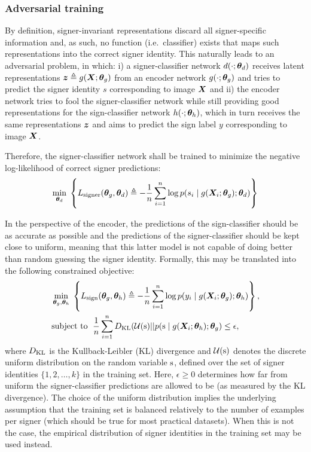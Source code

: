 

\subsubsection{Adversarial training}
By definition, signer-invariant representations discard all signer-specific information and, as such, no function (i.e.\ classifier) exists that maps such representations into the correct signer identity. This naturally leads to an adversarial problem, in which: i) a signer-classifier network $d(\cdot; {\bm{\theta}}_d)$ receives latent representations ${\bm{z}} \triangleq g({\bm{X}};{\bm{\theta}}_g)$ from an encoder network $g(\cdot;{\bm{\theta}}_g)$ and tries to predict the signer identity $s$ corresponding to image ${\bm{X}}$ and ii) the encoder network tries to fool the signer-classifier network while still providing good representations for the sign-classifier network $h(\cdot; {\bm{\theta}}_h)$, which in turn receives the same representations ${\bm{z}}$ and aims to predict the sign label $y$ corresponding to image ${\bm{X}}$.

Therefore, the signer-classifier network shall be trained to minimize the negative log-likelihood of correct signer predictions:
\begin{equation}
    \label{eq:signer_loss}
    \min_{{\bm{\theta}}_d} \; \left\lbrace L_{\text{signer}}({\bm{\theta}}_g, {\bm{\theta}}_d) \triangleq -\frac{1}{n}\sum_{i=1}^n \log p(s_i \mid g({\bm{X}}_{i}; {\bm{\theta}}_g); {\bm{\theta}}_d) \right\rbrace
\end{equation}

In the perspective of the encoder, the predictions of the sign-classifier should be as accurate as possible and the predictions of the signer-classifier should be kept close to uniform, meaning that this latter model is not capable of doing better than random guessing the signer identity. Formally, this may be translated into the following constrained objective:
\begin{align}
    \label{eq:sign_loss}
    &\min_{{\bm{\theta}}_g, {\bm{\theta}}_h} \; \left\lbrace L_{\text{sign}}({\bm{\theta}}_g, {\bm{\theta}}_h)\triangleq-\frac{1}{n}\sum_{i=1}^n \log p(y_i \mid g({\bm{X}}_{i}; {\bm{\theta}}_g); {\bm{\theta}}_h)\right\rbrace,\\
    \label{eq:kl_obj}
    &\text{subject to } \; \frac{1}{n}\sum_{i=1}^n D_{\mathrm{KL}}({\mathcal{U}}({\textnormal{s}}) || p({\textnormal{s}} \mid g({\bm{X}}_{i}; {\bm{\theta}}_h); {\bm{\theta}}_g) \leq \epsilon,
\end{align}
where $D_{\mathrm{KL}}$ is the Kullback-Leibler (KL) divergence and ${\mathcal{U}}({\textnormal{s}})$ denotes the discrete uniform distribution on the random variable ${\textnormal{s}}$, defined over the set of signer identities $\{1, 2, \dots, k\}$ in the training set. Here, $\epsilon \geq 0$ determines how far from uniform the signer-classifier predictions are allowed to be (as measured by the KL divergence). The choice of the uniform distribution implies the underlying assumption that the training set is balanced relatively to the number of examples per signer (which should be true for most practical datasets). When this is not the case, the empirical distribution of signer identities in the training set may be used instead.


